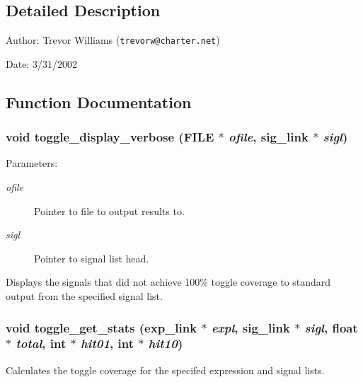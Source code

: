 \subsection{Detailed Description}
\begin{Desc}
\item[Author:]Trevor Williams ({\tt trevorw@charter.net}) \end{Desc}
\begin{Desc}
\item[Date:]3/31/2002\end{Desc}


\subsection{Function Documentation}
\subsubsection{\setlength{\rightskip}{0pt plus 5cm}void toggle\_\-display\_\-verbose (FILE $\ast$ {\em ofile}, {\bf sig\_\-link} $\ast$ {\em sigl})}\label{toggle_8c_a8}


\begin{Desc}
\item[Parameters:]
\begin{description}
\item[{\em ofile}]Pointer to file to output results to. \item[{\em sigl}]Pointer to signal list head.\end{description}
\end{Desc}
Displays the signals that did not achieve 100\% toggle coverage to standard output from the specified signal list. 
\subsubsection{\setlength{\rightskip}{0pt plus 5cm}void toggle\_\-get\_\-stats ({\bf exp\_\-link} $\ast$ {\em expl}, {\bf sig\_\-link} $\ast$ {\em sigl}, float $\ast$ {\em total}, int $\ast$ {\em hit01}, int $\ast$ {\em hit10})}\label{toggle_8c_a5}


Calculates the toggle coverage for the specifed expression and signal lists. 

